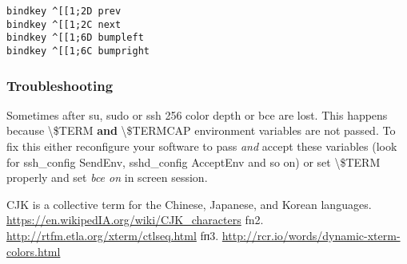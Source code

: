 \documentclass[10pt, a5paper]{article}
\begin{document}
\begin{verbatim}
bindkey ^[[1;2D prev
bindkey ^[[1;2C next
bindkey ^[[1;6D bumpleft
bindkey ^[[1;6C bumpright
\end{verbatim}
\subsubsection*{Troubleshooting}

Sometimes after su, sudo or ssh 256 color depth or bce are lost. This happens because \textbackslash{}\$TERM \textbf{and} \textbackslash{}\$TERMCAP environment variables are not passed. To fix this either reconfigure your software to pass \emph{and} accept these variables (look for ssh\_config SendEnv, sshd\_config AcceptEnv and so on) or set \textbackslash{}\$TERM properly and set \emph{bce on} in screen session.

\begin{thebibliography}{99}
 CJK is a collective term for the Chinese, Japanese, and Korean languages. \url{https://en.wikipedIA.org/wiki/CJK_characters} 
 fn2. \url{http://rtfm.etla.org/xterm/ctlseq.html}
 fп3. \url{http://rcr.io/words/dynamic-xterm-colors.html}
\end{thebibliography}
\end{document}
